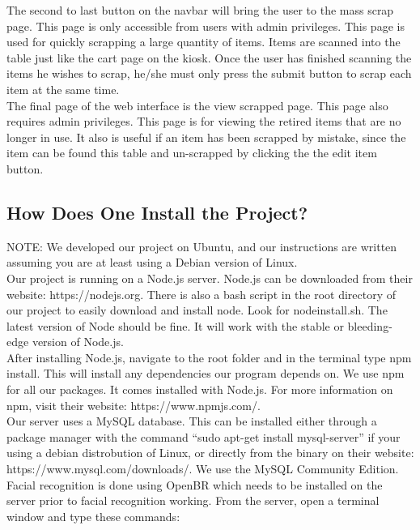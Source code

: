 \documentclass[10pt, onecolumn, twoside, peerreview]{IEEEtran}
\begin{document}
The second to last button on the navbar will bring the user to the mass scrap page. This page is only accessible from
users with admin privileges. This page is used for quickly scrapping a large quantity of items. Items are scanned into
the table just like the cart page on the kiosk. Once the user has finished scanning the items he wishes to scrap, he/she
must only press the submit button to scrap each item at the same time.\\

The final page of the web interface is the view scrapped page. This page also requires admin privileges. This page is
for viewing the retired items that are no longer in use. It also is useful if an item has been scrapped by mistake,
since the item can be found this table and un-scrapped by clicking the the edit item button.

\subsection{How Does One Install the Project?}
NOTE: We developed our project on Ubuntu, and our instructions are written assuming you are at least using a Debian version of Linux.\\

Our project is running on a Node.js server. Node.js can be downloaded from their website: https://nodejs.org. There is also a bash script in the root directory of our project to easily download and install node. Look for nodeinstall.sh. The latest version of Node should be fine. It will work with the stable or bleeding-edge version of Node.js.\\

After installing Node.js, navigate to the root folder and in the terminal type npm install. This will install any dependencies our program depends on. We use npm for all our packages. It comes installed with Node.js. For more information on npm, visit their website: https://www.npmjs.com/.\\

Our server uses a MySQL database. This can be installed either through a package manager with the command “sudo apt-get install mysql-server” if your using a debian distrobution of Linux, or directly from the binary on their website: https://www.mysql.com/downloads/. We use the MySQL Community Edition.\\

Facial recognition is done using OpenBR which needs to be installed on the server prior to facial recognition working. From the server, open a terminal window and type these commands:
\end{document}
